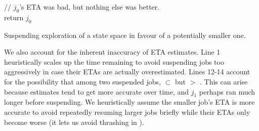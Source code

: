 \begin{algorithm}[t]
	// $j_0$'s ETA was bad, but nothing else was better. \\
	return $j_0$
	\caption{Suspending exploration of a state space in favour of a potentially smaller one.}
	\label{alg:shouldworkblock}
\end{algorithm}

%
We also account for the inherent inaccuracy of ETA estimates.
Line 1 heuristically scales up the time remaining to avoid suspending jobs too aggressively
in case their ETAs are actually overestimated.
Lines 12-14 account for the
possibility that among two suspended jobs,
 $\subset$ 
but
 $>$ .
This can arise because estimates tend to get more accurate over time,
and $j_1$ perhaps ran much longer before suspending.
We heuristically assume the smaller job's ETA is more accurate
to avoid repeatedly resuming larger jobs briefly while their ETAs only become worse
(it lets us avoid thrashing in \quicksand).


